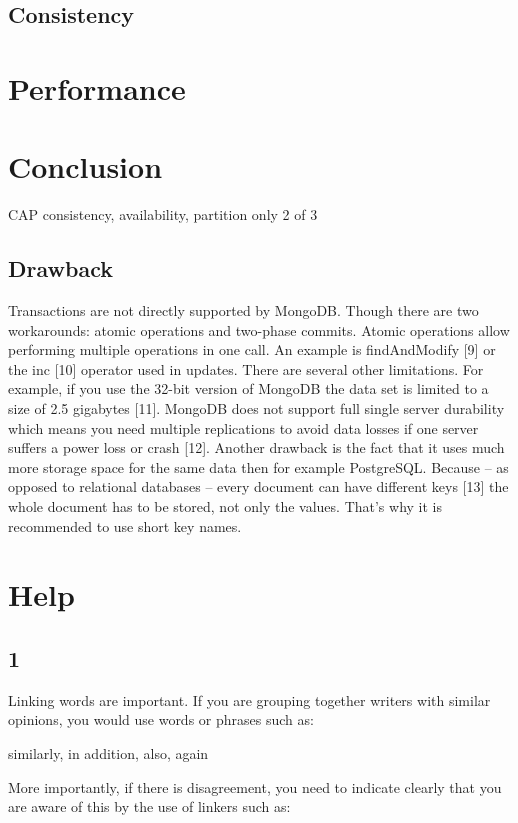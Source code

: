 \documentclass[12pt,letter]{article}
\begin{document}
\subsection{Consistency}

\section{Performance}

\section{Conclusion}
CAP consistency, availability, partition
only 2 of 3

\subsection{Drawback}
Transactions are not directly supported by MongoDB. Though there are two workarounds: atomic operations and two-phase commits. Atomic operations allow performing multiple operations in one call. An example is findAndModify [9] or the inc [10] operator used in updates.
There are several other limitations. For example, if you use the 32-bit version of MongoDB the data set is limited to a size of 2.5 gigabytes [11]. MongoDB does not support full single server durability which means you need multiple replications to avoid data losses if one server suffers a power loss or crash [12]. Another drawback is the fact that it uses much more storage space for the same data then for example PostgreSQL. Because – as opposed to relational databases – every document can have different keys [13] the whole document has to be stored, not only the values. That’s why it is recommended to use short key names.


\section*{Help}
\subsection*{1}
Linking words are important. If you are grouping together writers with similar opinions, you would use words or phrases such as:

similarly, in addition, also, again

More importantly, if there is disagreement, you need to indicate clearly that you are aware of this by the use of linkers such as:
\end{document}
